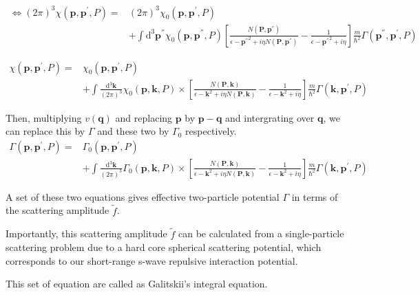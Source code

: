 \[ \begin{split} \Leftrightarrow (2\pi)^3 \chi(\mathbf{p},\mathbf{p}^{'},P) =& (2\pi)^3\chi_0(\mathbf{p},\mathbf{p}^{'},P) \\
&+ \int \mathrm{d}^3 \mathbf{p}^{''} \chi_0(\mathbf{p},\mathbf{p}^{''},P) \left[ \frac{N(\mathbf{P},\mathbf{p}^{''})}{\epsilon - {\mathbf{p}^{''}}^2+i \eta N(\mathbf{P},\mathbf{p}^{''})} - \frac{1}{\epsilon - {\mathbf{p}^{''}}^2+i \eta} \right]\frac{m}{\hbar^2} \Gamma(\mathbf{p}^{''},\mathbf{p}^{'},P) \end{split}\]

\[ \begin{split} \chi(\mathbf{p},\mathbf{p}^{'},P) =& \chi_0(\mathbf{p},\mathbf{p}^{'},P) \\
&+ \int \frac{\mathrm{d}^3 \mathbf{k}}{(2\pi)^3} \chi_0(\mathbf{p},\mathbf{k},P) \times \left[ \frac{N(\mathbf{P},\mathbf{k})}{\epsilon - {\mathbf{k}}^2+i \eta N(\mathbf{P},\mathbf{k})} - \frac{1}{\epsilon - {\mathbf{k}}^2+i \eta} \right]\frac{m}{\hbar^2} \Gamma(\mathbf{k},\mathbf{p}^{'},P)\end{split}\]

Then, multiplying $v(\mathbf{q})$ and replacing $\mathbf{p}$ by $\mathbf{p}-\mathbf{q}$ and intergrating over $\mathbf{q}$, we can replace this by $\Gamma$ and these two by $\Gamma_0$ respectively.
\begin{equation} \label{Eqs2.7.24} \begin{split}
\Gamma(\mathbf{p},\mathbf{p}^{'},P) =& \Gamma_0(\mathbf{p},\mathbf{p}^{'},P) \\
&+ \int \frac{\mathrm{d}^3 \mathbf{k}}{(2\pi)^3} \Gamma_0(\mathbf{p},\mathbf{k},P) \times \left[ \frac{N(\mathbf{P},\mathbf{k})}{\epsilon - {\mathbf{k}}^2+i \eta N(\mathbf{P},\mathbf{k})} - \frac{1}{\epsilon - {\mathbf{k}}^2+i \eta} \right]\frac{m}{\hbar^2} \Gamma(\mathbf{k},\mathbf{p}^{'},P)
\end{split}\end{equation}

A set of these two equations gives effective two-particle potential $\Gamma$ in terms of the scattering amplitude $\tilde{f}$.

Importantly, this scattering amplitude $\tilde{f}$ can be calculated from a single-particle scattering problem due to a hard core spherical scattering potential, which corresponds to our short-range s-wave repulsive interaction potential.

This set of equation are called as Galitskii's integral equation.

